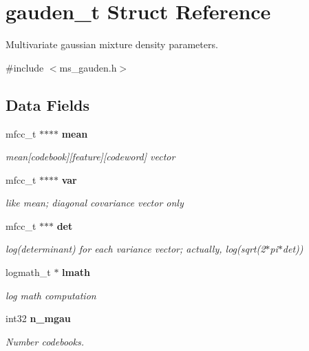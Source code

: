 \section{gauden\+\_\+t Struct Reference}
\label{structgauden__t}


Multivariate gaussian mixture density parameters.  




{\ttfamily \#include $<$ms\+\_\+gauden.\+h$>$}

\subsection*{Data Fields}
\begin{DoxyCompactItemize}
\item 
\mbox{\label{structgauden__t_aa76d63009601dcb6b99f17db96167f37}} 
mfcc\+\_\+t $\ast$$\ast$$\ast$$\ast$ \textbf{ mean}
\begin{DoxyCompactList}\small\item\em mean[codebook][feature][codeword] vector \end{DoxyCompactList}\item 
\mbox{\label{structgauden__t_a172cb69c018608ab8c33d54e6f0fdf19}} 
mfcc\+\_\+t $\ast$$\ast$$\ast$$\ast$ \textbf{ var}
\begin{DoxyCompactList}\small\item\em like mean; diagonal covariance vector only \end{DoxyCompactList}\item 
\mbox{\label{structgauden__t_a315918a44ff97b95a6fcdf8739d8089b}} 
mfcc\+\_\+t $\ast$$\ast$$\ast$ \textbf{ det}
\begin{DoxyCompactList}\small\item\em log(determinant) for each variance vector; actually, log(sqrt(2$\ast$pi$\ast$det)) \end{DoxyCompactList}\item 
\mbox{\label{structgauden__t_ae05c9b82d8a586bea347681ebe04bb83}} 
logmath\+\_\+t $\ast$ \textbf{ lmath}
\begin{DoxyCompactList}\small\item\em log math computation \end{DoxyCompactList}\item 
\mbox{\label{structgauden__t_af15df11bd2f3ab0290e0a33ca15c836c}} 
int32 \textbf{ n\+\_\+mgau}
\begin{DoxyCompactList}\small\item\em Number codebooks. \end{DoxyCompactList}\item 

\end{DoxyCompactItemize}
